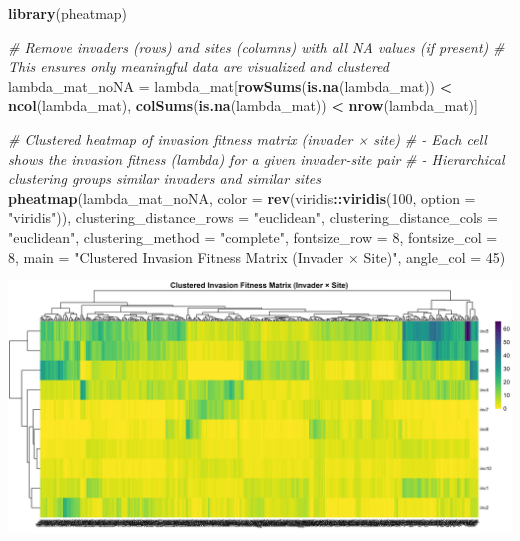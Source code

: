 \documentclass[
]{article}
\newenvironment{Shaded}{\begin{snugshade}}{\end{snugshade}}
\newcommand{\AttributeTok}[1]{\textcolor[rgb]{0.13,0.29,0.53}{#1}}
\newcommand{\CommentTok}[1]{\textcolor[rgb]{0.56,0.35,0.01}{\textit{#1}}}
\newcommand{\DecValTok}[1]{\textcolor[rgb]{0.00,0.00,0.81}{#1}}
\newcommand{\FunctionTok}[1]{\textcolor[rgb]{0.13,0.29,0.53}{\textbf{#1}}}
\newcommand{\NormalTok}[1]{#1}
\newcommand{\OtherTok}[1]{\textcolor[rgb]{0.56,0.35,0.01}{#1}}
\newcommand{\SpecialCharTok}[1]{\textcolor[rgb]{0.81,0.36,0.00}{\textbf{#1}}}
\newcommand{\StringTok}[1]{\textcolor[rgb]{0.31,0.60,0.02}{#1}}
\begin{document}
\begin{Shaded}
\begin{Highlighting}[]
\FunctionTok{library}\NormalTok{(pheatmap)}

\CommentTok{\# Remove invaders (rows) and sites (columns) with all NA values (if present)}
\CommentTok{\# This ensures only meaningful data are visualized and clustered}
\NormalTok{lambda\_mat\_noNA }\OtherTok{=}\NormalTok{ lambda\_mat[}\FunctionTok{rowSums}\NormalTok{(}\FunctionTok{is.na}\NormalTok{(lambda\_mat)) }\SpecialCharTok{\textless{}} \FunctionTok{ncol}\NormalTok{(lambda\_mat),}
                             \FunctionTok{colSums}\NormalTok{(}\FunctionTok{is.na}\NormalTok{(lambda\_mat)) }\SpecialCharTok{\textless{}} \FunctionTok{nrow}\NormalTok{(lambda\_mat)]}

\CommentTok{\# Clustered heatmap of invasion fitness matrix (invader × site)}
\CommentTok{\# {-} Each cell shows the invasion fitness (lambda) for a given invader{-}site pair}
\CommentTok{\# {-} Hierarchical clustering groups similar invaders and similar sites}
\FunctionTok{pheatmap}\NormalTok{(lambda\_mat\_noNA,}
         \AttributeTok{color =} \FunctionTok{rev}\NormalTok{(viridis}\SpecialCharTok{::}\FunctionTok{viridis}\NormalTok{(}\DecValTok{100}\NormalTok{, }\AttributeTok{option =} \StringTok{"viridis"}\NormalTok{)),}
         \AttributeTok{clustering\_distance\_rows =} \StringTok{"euclidean"}\NormalTok{,}
         \AttributeTok{clustering\_distance\_cols =} \StringTok{"euclidean"}\NormalTok{,}
         \AttributeTok{clustering\_method =} \StringTok{"complete"}\NormalTok{,}
         \AttributeTok{fontsize\_row =} \DecValTok{8}\NormalTok{, }\AttributeTok{fontsize\_col =} \DecValTok{8}\NormalTok{,}
         \AttributeTok{main =} \StringTok{"Clustered Invasion Fitness Matrix (Invader × Site)"}\NormalTok{,}
         \AttributeTok{angle\_col =} \DecValTok{45}\NormalTok{)}
\end{Highlighting}
\end{Shaded}

\includegraphics[width=1\linewidth]{man/figures/README-fitness-cluster-1}
\end{document}
